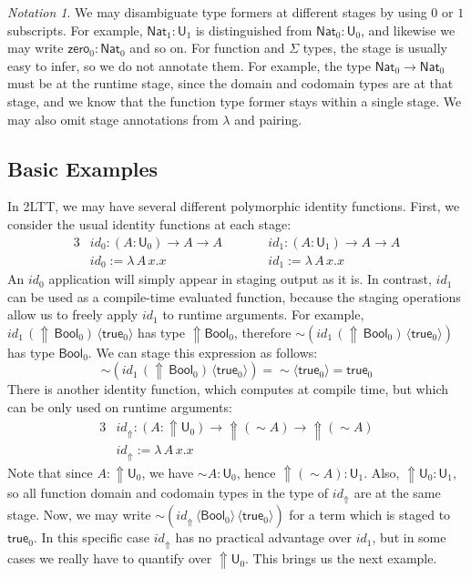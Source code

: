 \documentclass[acmsmall]{acmart}
\newcommand{\mit}[1]{\mathit{#1}}
\newcommand{\msf}[1]{\mathsf{#1}}
\newcommand{\Lift}{{\Uparrow}}
\newcommand{\spl}{{\sim}}
\newcommand{\qut}[1]{\langle #1\rangle}
\renewcommand{\U}{\msf{U}}
\newcommand{\Bool}{\msf{Bool}}
\newcommand{\true}{\msf{true}}
\newcommand{\Nat}{\msf{Nat}}
\newcommand{\zero}{\msf{zero}}
\theoremstyle{remark}
\newtheorem{notation}{Notation}
\begin{document}
\begin{notation} We may disambiguate type formers at different stages by using $0$ or $1$
subscripts. For example, $\Nat_1 : \U_1$ is distinguished from $\Nat_0 : \U_0$,
and likewise we may write $\zero_0 : \Nat_0$ and so on. For function and
$\Sigma$ types, the stage is usually easy to infer, so we do not annotate
them. For example, the type $\Nat_0 \to \Nat_0$ must be at the runtime stage,
since the domain and codomain types are at that stage, and we know that the
function type former stays within a single stage. We may also omit stage annotations
from $\lambda$ and pairing.
\end{notation}

\subsection{Basic Examples}

In 2LTT, we may have several different polymorphic identity functions. First, we
consider the usual identity functions at each stage:
\begin{alignat*}{3}
  & \mit{id}_0 : (A : \U_0) \to A \to A\hspace{2em} && \mit{id}_1 : (A : \U_1) \to A \to A\\
  & \mit{id}_0 := \lambda\,A\,x.x       && \mit{id}_1 := \lambda\,A\,x.x
\end{alignat*}
An $\mit{id}_0$ application will simply appear in staging output as it is. In
contrast, $\mit{id}_1$ can be used as a compile-time evaluated function, because
the staging operations allow us to freely apply $\mit{id}_1$ to runtime
arguments. For example, $\mit{id}_1\,(\Lift\,\Bool_0)\,\qut{\true_0}$ has type
$\Lift \Bool_0$, therefore $\spl(\mit{id}_1\,(\Lift\,\Bool_0)\,\qut{\true_0})$
has type $\Bool_0$. We can stage this expression as follows:
\[
\spl(\mit{id}_1\,(\Lift\,\Bool_0)\,\qut{\true_0}) = \spl\qut{\true_0} = \true_0
\]
There is another identity function, which computes at compile time, but which
can be only used on runtime arguments:
\begin{alignat*}{3}
  & \mit{id_\Lift} : (A : \Lift\U_0) \to \Lift (\spl A) \to \Lift (\spl A)\\
  & \mit{id_\Lift} := \lambda\,A\,x.x
\end{alignat*}
Note that since $A : \Lift\U_0$, we have $\spl A : \U_0$, hence $\Lift (\spl A)
: \U_1$.  Also, $\Lift\U_0 : \U_1$, so all function domain and codomain types in
the type of $\mit{id_\Lift}$ are at the same stage. Now, we may write
$\spl(\mit{id_\Lift}\,\qut{\Bool_0}\,\qut{\true_0})$ for a term which is staged
to $\true_0$. In this specific case $\mit{id_\Lift}$ has no practical advantage
over $\mit{id}_1$, but in some cases we really have to quantify over
$\Lift\U_0$. This brings us the next example.
\end{document}
